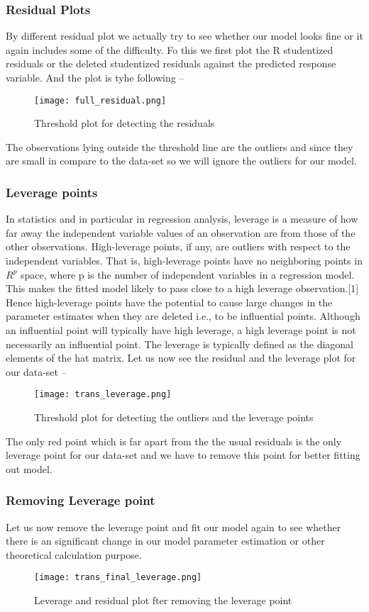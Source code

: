 \documentclass[A4paper,11pt]{report}
\begin{document}
	 \subsubsection{Residual Plots}
	 By different residual plot we actually try to see whether our model looks fine or it again includes some of the difficulty. Fo this we first plot the R studentized residuals or the deleted studentized residuals against the predicted response variable. And the plot is tyhe following --
	 \begin{figure}[H]
	 	\texttt{[image: full\_residual.png]}
	 	\caption{Threshold plot for detecting the residuals}
	 \end{figure}
	 The observations lying outside the threshold line are the outliers and since they are small in compare to the data-set so we will ignore the outliers for our model.
	 \subsubsection{Leverage points}
	 In statistics and in particular in regression analysis, leverage is a measure of how far away the independent variable values of an observation are from those of the other observations. High-leverage points, if any, are outliers with respect to the independent variables. That is, high-leverage points have no neighboring points in     $R ^p$ space, where p is the number of independent variables in a regression model. This makes the fitted model likely to pass close to a high leverage observation.[1] Hence high-leverage points have the potential to cause large changes in the parameter estimates when they are deleted i.e., to be influential points. Although an influential point will typically have high leverage, a high leverage point is not necessarily an influential point. The leverage is typically defined as the diagonal elements of the hat matrix.
	 Let us now see the residual and the leverage plot for our data-set -- 
	 \begin{figure}[H]
	 	\texttt{[image: trans\_leverage.png]}
	 	\caption{Threshold plot for detecting the outliers and the leverage points}
	 \end{figure}	
 	 The only red point which is far apart from the the usual residuals is the only leverage point for our data-set and we have to remove this point for better fitting out model. 
	 \subsubsection{Removing Leverage point}
	 Let us now remove the leverage point and fit our model again to see whether there is an significant change in our model parameter estimation or other theoretical calculation purpose.
	 \begin{figure}[H]
	 	\texttt{[image: trans\_final\_leverage.png]}
	 	\caption{Leverage and residual plot fter removing the leverage point}
	 \end{figure}
\end{document}
